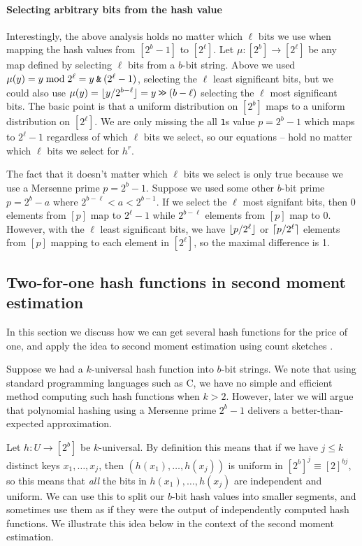 \paragraph{Selecting arbitrary bits from the hash value}
Interestingly, the above analysis holds no matter which $\ell$ bits we
use when mapping the hash values from $[2^b-1]$ to $[2^\ell]$.  Let
$\mu:[2^b]\to[2^\ell]$ be any map defined by selecting $\ell$ bits
from a $b$-bit string. Above we used
$\mu(y)=y\bmod 2^\ell=y\mathbin{\texttt{\&}}  (2^\ell-1)$,
selecting the $\ell$ least significant bits, but we could
also use $\mu(y)=\lfloor {y/2^{b-\ell}} \rfloor=y\mathbin{\texttt{>\!>}} (b-\ell)$ selecting
the $\ell$ most significant bits. The basic point is that a uniform
distribution on $[2^b]$ maps to a uniform distribution on
$[2^\ell]$. We are only missing the all \texttt1s value $p=2^b-1$ which maps to $2^\ell-1$
regardless of which $\ell$ bits we select, so our equations
-- hold no matter which $\ell$
bits we select for $h^r$.

The fact that it doesn't matter which $\ell$ bits we select is only
true because we use a Mersenne prime $p=2^b-1$. Suppose we used some
other $b$-bit prime $p=2^b-a$ where $2^{b-\ell}<a<2^{b-1}$. If we
select the $\ell$ most signifant bits, then $0$ elements from $[p]$
map to $2^\ell-1$ while $2^{b-\ell}$ elements from $[p]$ map to $0$. However,
with the $\ell$ least significant bits, we have $\lfloor {p/2^\ell} \rfloor$ or
$\lceil {p/2^\ell}\rceil$ elements from $[p]$ mapping to each element in
$[2^\ell]$, so the maximal difference is 1.


\subsection{Two-for-one hash functions in second moment estimation}
In this section we discuss how we can get several hash functions for
the price of one, and apply the idea to second moment estimation using
count sketches \cite{charikar04count-sketch}.

Suppose we had a $k$-universal hash function into $b$-bit strings.
We note that using standard programming languages such as C, we have
no simple and efficient method computing such hash
functions when $k>2$. However, later we will argue that polynomial
hashing using a Mersenne prime $2^b-1$ delivers a better-than-expected
approximation.

Let $h:U\to [2^b]$ be $k$-universal. By definition this
means that if we have $j\leq k$ distinct keys $x_1,\ldots,x_j$, then
$(h(x_1),\ldots,h(x_j))$ is uniform in $[2^b]^j\equiv [2]^{bj}$,
so this means that \emph{all} the bits in $h(x_1),\ldots,h(x_j)$ are
independent and uniform. We can use this to split our $b$-bit hash
values into smaller segments, and sometimes use them as if
they were the output of independently computed hash functions.
We illustrate this idea below in the context of the second moment estimation.

